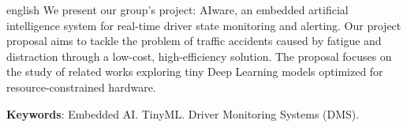 \documentclass[
	12pt,				%
	openright,			%
	oneside,			%
	a4paper,			%
	english,			%
	english				%
	]{abntex2}
\newcommand{\listofquadrosname}{Lista de quadros}
\begin{document}
\begin{resumo}[Abstract]
 \begin{otherlanguage*}{english}
   We present our group's project: AIware, an embedded artificial intelligence system for real-time driver state monitoring and alerting. Our project proposal aims to tackle the problem of traffic accidents caused by fatigue and distraction through a low-cost, high-efficiency solution. The proposal focuses on the study of related works exploring tiny Deep Learning models optimized for resource-constrained hardware.

   \vspace{\onelineskip}

   \noindent
   \textbf{Keywords}: Embedded AI. TinyML. Driver Monitoring Systems (DMS).
 \end{otherlanguage*}
\end{resumo}








\end{document}
